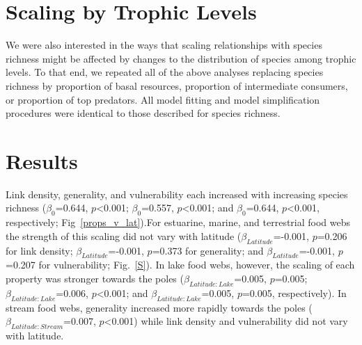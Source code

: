 \documentclass[12pt]{article}
\begin{document}
  \section*{Scaling by Trophic Levels}

    We were also interested in the ways that scaling relationships with species richness might
    be affected by changes to the distribution of species among trophic levels. To
    that end, we repeated all of the above analyses replacing species richness by
    proportion of basal resources, proportion of intermediate consumers,
    or proportion of top predators. All model fitting and model
    simplification procedures were identical to those described for species
    richness.


\section*{Results}

  Link density, generality, and vulnerability each increased with increasing
  species richness ($\beta_0$=0.644, $p$\textless0.001; $\beta_0$=0.557,
  $p$\textless0.001; and $\beta_0$=0.644, $p$\textless0.001, respectively;
  Fig~\ref{props_v_lat}).For estuarine, marine, and terrestrial food webs the
  strength of this scaling did not vary with latitude
  ($\beta_{Latitude}$=-0.001, $p$=0.206 for link density;
  $\beta_{Latitude}$=-0.001, $p$=0.373 for generality; and
  $\beta_{Latitude}$=-0.001, $p$=0.207 for vulnerability; Fig.~\ref{S}). In
  lake food webs, however, the scaling of each property was stronger towards
  the poles ($\beta_{Latitude:Lake}$=0.005, $p$=0.005;
  $\beta_{Latitude:Lake}$=0.006, $p$\textless0.001; and
  $\beta_{Latitude:Lake}$=0.005, $p$=0.005, respectively). In stream food
  webs, generality increased more rapidly towards the poles
  ($\beta_{Latitude:Stream}$=0.007, $p$\textless0.001) while link density and
  vulnerability did not vary with latitude.
\end{document}
